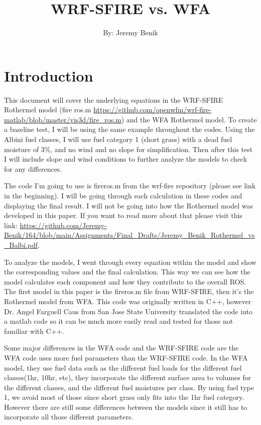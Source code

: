 \documentclass{article}
\newcommand\und{\textunderscore}
\begin{document}
\title{WRF-SFIRE vs. WFA}
\author{By: Jeremy Benik}
\maketitle
\section{Introduction}
	This document will cover the underlying equations in the WRF-SFIRE Rothermel model (fire \und ros.m \url{https://github.com/openwfm/wrf-fire-matlab/blob/master/vis3d/fire_ros.m}) and the WFA Rothermel model. To create a baseline test, I will be using the same example throughout the codes. Using the Albini fuel classes, I will use fuel category 1 (short grass) with a dead fuel moisture of 3\%, and no wind and no slope for simplification. Then after this test I will include slope and wind conditions to further analyze the models to check for any differences.

The code I'm going to use is fire\textunderscore ros.m from the wrf-fire repository (please see link in the beginning). I will be going through each calculation in these codes and displaying the final result. I will not be going into how the Rothermel model was developed in this paper. If you want to read more about that please visit this link: \url{https://github.com/Jeremy-Benik/164/blob/main/Assignments/Final_Drafts/Jeremy_Benik_Rothermel_vs_Balbi.pdf}. 

To analyze the models, I went through every equation within the model and show the corresponding values and the final calculation. This way we can see how the model calculates each component and how they contribute to the overall ROS. The first model in this paper is the fire\und ros.m file from WRF-SFIRE, then it's the Rothermel model from WFA. This code was originally written in C++, however Dr. Angel Farguell Caus from San Jose State University translated the code into a matlab code so it can be much more easily read and tested for those not familiar with C++. 

Some major differences in the WFA code and the WRF-SFIRE code are the WFA code uses more fuel parameters than the WRF-SFIRE code. In the WFA model, they use fuel data such as the different fuel loads for the different fuel classes(1hr, 10hr, etc), they incorporate the different surface area to volumes for the different classes, and the different fuel moistures per class. By using fuel type 1, we avoid most of those since short grass only fits into the 1hr fuel category. However there are still some differences between the models since it still has to incorporate all those different parameters. 
\end{document}
